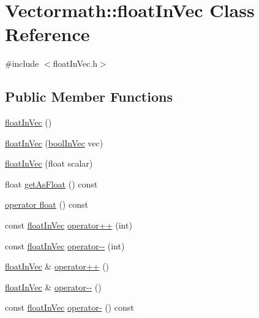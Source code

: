 \hypertarget{classVectormath_1_1floatInVec}{\section{Vectormath\-:\-:float\-In\-Vec Class Reference}
\label{classVectormath_1_1floatInVec}
}


{\ttfamily \#include $<$float\-In\-Vec.\-h$>$}

\subsection*{Public Member Functions}
\begin{DoxyCompactItemize}
\item 
\hyperlink{classVectormath_1_1floatInVec_ad51654baad711b064671f4cb2ad5e5b5}{float\-In\-Vec} ()
\item 
\hyperlink{classVectormath_1_1floatInVec_afaa5f27e47ae2f7c1eabfc721b2619bb}{float\-In\-Vec} (\hyperlink{classVectormath_1_1boolInVec}{bool\-In\-Vec} vec)
\item 
\hyperlink{classVectormath_1_1floatInVec_a0d9fe72973e2d8393e29bc5891fc0549}{float\-In\-Vec} (float scalar)
\item 
float \hyperlink{classVectormath_1_1floatInVec_a2f59a1d380fd3990ba8881dc75de19bf}{get\-As\-Float} () const 
\item 
\hyperlink{classVectormath_1_1floatInVec_adf55ff2bb10f7412fc5862e55ec8be48}{operator float} () const 
\item 
const \hyperlink{classVectormath_1_1floatInVec}{float\-In\-Vec} \hyperlink{classVectormath_1_1floatInVec_adf90abe101b93990227e5e7ea879bdb7}{operator++} (int)
\item 
const \hyperlink{classVectormath_1_1floatInVec}{float\-In\-Vec} \hyperlink{classVectormath_1_1floatInVec_a73b9b6bb31e6e833de65a797e3d45dba}{operator-\/-\/} (int)
\item 
\hyperlink{classVectormath_1_1floatInVec}{float\-In\-Vec} \& \hyperlink{classVectormath_1_1floatInVec_a8809092da8cc4515717703ce9a405621}{operator++} ()
\item 
\hyperlink{classVectormath_1_1floatInVec}{float\-In\-Vec} \& \hyperlink{classVectormath_1_1floatInVec_a20fdc0646e155d22f5783274a9f97791}{operator-\/-\/} ()
\item 
const \hyperlink{classVectormath_1_1floatInVec}{float\-In\-Vec} \hyperlink{classVectormath_1_1floatInVec_a42ef073dfef0cf53448efa875ab37f8b}{operator-\/} () const 
\item 

\end{DoxyCompactItemize}
